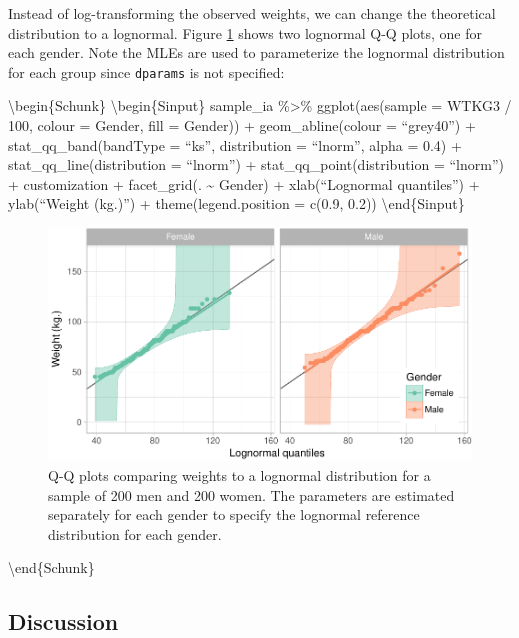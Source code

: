 Instead of log-transforming the observed weights, we can change the
theoretical distribution to a lognormal. Figure \ref{fig:weights-log}
shows two lognormal Q-Q plots, one for each gender. Note the MLEs are
used to parameterize the lognormal distribution for each group since
\texttt{dparams} is not specified:

\textbackslash{}begin\{Schunk\} \textbackslash{}begin\{Sinput\}
sample\_ia \%\textgreater{}\% ggplot(aes(sample = WTKG3 / 100, colour =
Gender, fill = Gender)) + geom\_abline(colour = ``grey40'') +
stat\_qq\_band(bandType = ``ks'', distribution = ``lnorm'', alpha = 0.4)
+ stat\_qq\_line(distribution = ``lnorm'') +
stat\_qq\_point(distribution = ``lnorm'') + customization +
facet\_grid(. \textasciitilde{} Gender) + xlab(``Lognormal quantiles'')
+ ylab(``Weight (kg.)'') + theme(legend.position = c(0.9, 0.2))
\textbackslash{}end\{Sinput\}

\begin{figure}

{\centering \includegraphics[width=0.9\linewidth]{loy-figures/weights-log-1} 

}

\caption[Q-Q plots comparing weights to a lognormal distribution for a sample of 200 men and 200 women]{Q-Q plots comparing weights to a lognormal distribution for a sample of 200 men and 200 women. The parameters are estimated separately for each gender to specify the lognormal reference distribution for each gender.}\label{fig:weights-log}
\end{figure}

\textbackslash{}end\{Schunk\}

\hypertarget{discussion}{%
\subsection{Discussion}\label{discussion}}


